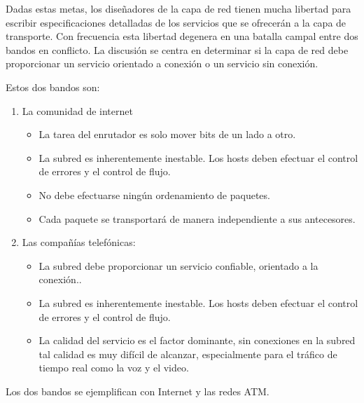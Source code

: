 \par Dadas estas metas, los diseñadores de la capa de red tienen mucha libertad para 
escribir especificaciones detalladas de los servicios que se ofrecerán a la capa de 
transporte. Con frecuencia esta libertad degenera en una batalla campal entre dos 
bandos en conflicto. La discusión se centra en determinar si la capa de red debe 
proporcionar un servicio orientado a conexión o un servicio sin conexión.
\par Estos dos bandos son:
	\begin{enumerate}
		\item La comunidad de internet
		\begin{itemize}\itemsep=0pt
			\item La tarea del enrutador es solo mover bits de un lado a otro.
			\item La subred es inherentemente inestable. Los hosts deben efectuar el 
			control de errores y el control de flujo.
			\item No debe efectuarse ningún ordenamiento de paquetes.
			\item Cada paquete se transportará de manera independiente a sus 
			antecesores.
			\end{itemize}
		\item Las compañías telefónicas:
		\begin{itemize}\itemsep=0pt
			\item La subred debe proporcionar un servicio confiable, orientado a la
conexión..
			\item La subred es inherentemente inestable. Los hosts deben efectuar el 
			control de errores y el control de flujo.
			\item La calidad del servicio es el factor dominante, sin conexiones en la 
			subred tal calidad es muy difícil de alcanzar, especialmente para el tráfico de 
			tiempo real como la voz y el video.
		\end{itemize}
	\end{enumerate}
\par Los dos bandos se ejemplifican con Internet y las redes ATM.

